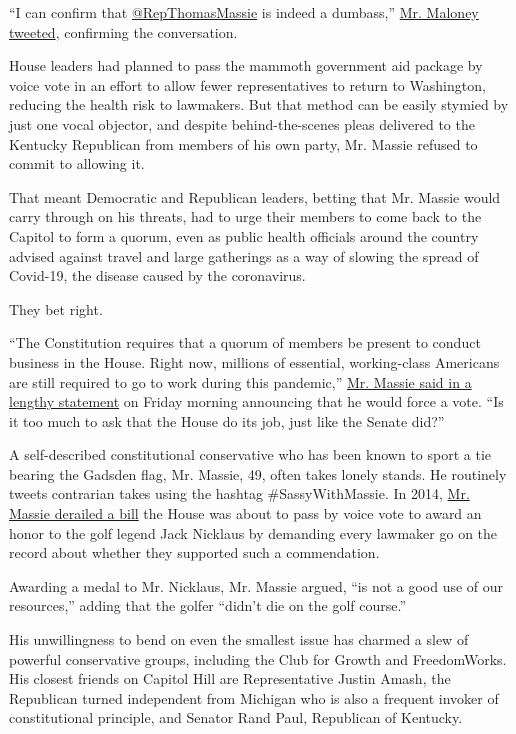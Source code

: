 ``I can confirm that
\href{https://slack-redir.net/link?url=https\%3A\%2F\%2Ftwitter.com\%2FRepThomasMassie}{@RepThomasMassie}
is indeed a dumbass,''
\href{https://twitter.com/RepSeanMaloney/status/1243585547941154817?s=20}{Mr.
Maloney tweeted}, confirming the conversation.

House leaders had planned to pass the mammoth government aid package by
voice vote in an effort to allow fewer representatives to return to
Washington, reducing the health risk to lawmakers. But that method can
be easily stymied by just one vocal objector, and despite
behind-the-scenes pleas delivered to the Kentucky Republican from
members of his own party, Mr. Massie refused to commit to allowing it.

That meant Democratic and Republican leaders, betting that Mr. Massie
would carry through on his threats, had to urge their members to come
back to the Capitol to form a quorum, even as public health officials
around the country advised against travel and large gatherings as a way
of slowing the spread of Covid-19, the disease caused by the
coronavirus.

They bet right.

``The Constitution requires that a quorum of members be present to
conduct business in the House. Right now, millions of essential,
working-class Americans are still required to go to work during this
pandemic,''
\href{https://twitter.com/RepThomasMassie/status/1243565643137454080?s=20}{Mr.
Massie said in a lengthy statement} on Friday morning announcing that he
would force a vote. ``Is it too much to ask that the House do its job,
just like the Senate did?''

A self-described constitutional conservative who has been known to sport
a tie bearing the Gadsden flag, Mr. Massie, 49, often takes lonely
stands. He routinely tweets contrarian takes using the hashtag
\#SassyWithMassie. In 2014,
\href{https://www.cincinnati.com/story/news/politics/2014/06/15/congressman-thinks-answer/10565771/}{Mr.
Massie derailed a bill} the House was about to pass by voice vote to
award an honor to the golf legend Jack Nicklaus by demanding every
lawmaker go on the record about whether they supported such a
commendation.

Awarding a medal to Mr. Nicklaus, Mr. Massie argued, ``is not a good use
of our resources,'' adding that the golfer ``didn't die on the golf
course.''

His unwillingness to bend on even the smallest issue has charmed a slew
of powerful conservative groups, including the Club for Growth and
FreedomWorks. His closest friends on Capitol Hill are Representative
Justin Amash, the Republican turned independent from Michigan who is
also a frequent invoker of constitutional principle, and Senator Rand
Paul, Republican of Kentucky.

